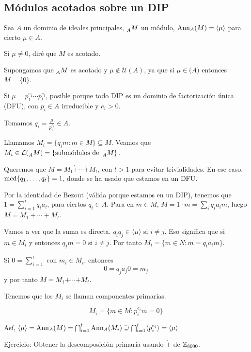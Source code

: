 \subsection{Módulos acotados sobre un DIP}

\begin{df}
  Sea \(A\) un dominio de ideales principales, \(\prescript{}{A}{M}\)
  un módulo, \(\operatorname{Ann}_A(M)=\langle\mu\rangle\) para cierto \(\mu\in A\).

  Si \(\mu\neq 0\), diré que \(M\) es acotado.
\end{df}

Supongamos que \(\prescript{}{A}{M}\) es acotado y \(\mu\not\in
\mathcal{U}(A)\), ya que si \(\mu\in\mathcal(A)\) entonces \(M=\{0\}\).

Si \(\mu=p_1^{e_1}\cdots p_t^{e_t}\), posible porque todo DIP es un
dominio de factorización única (DFU), con \(p_i\in A\) irreducible
y \(e_i>0\).

\begin{prop}
  Tomamos \(q_i=\frac{\mu}{p_i^{e_i}}\in A\).

  Llamamos \(M_i=\{q_i m:m \in M\}\subseteq M\). Veamos
  que \(M_i\in\mathcal{L}(\prescript{}{A}{M})=\{\textrm{submódulos
  de } \prescript{}{A}{M}\}\).

  Queremos que \(M=M_1\dot{+}\cdots \dot{+}M_t\), con \(t>1\) para
  evitar trivialidades. En ese caso, \(\operatorname{mcd}\{q_1,\ldots,q_t\}=1\),
  donde se ha usado que estamos en un DFU.\@

  Por la identidad de Bezout (válida porque estamos en un DIP),
  tenemos que \(1=\sum_{i=1}^t q_i a_i\), para ciertos \(q_i\in A\).
  Para en \(m\in M\), \(M=1\cdot m=\sum_i q_i a_i m\), luego
  \(M=M_1+\cdots+ M_t\).

  Vamos a ver que la suma es directa.
  \(q_i q_j\in\langle\mu\rangle\) si \(i\neq j\). Eso significa que si
  \(m\in M_i\) y entonces \(q_j m= 0\) si \(i\neq j\).
  Por tanto \(M_i=\{m\in N: m=q_i a_i m\}\).

  Si \(0=\sum_{i=1}^t\) con \(m_i\in M_i\), entonces
  \[
    0=q_j a_j 0=m_j
  \]
  y por tanto \(M=M_1\dot{+}\cdots\dot{+} M_t\).
\end{prop}

\begin{df}
  Tenemos que los \(M_i\) se llaman componentes primarias.
\end{df}
\begin{prop}
  \[
    M_i=\{m\in M: p_i^{e_i} m=0\}
  \]

  Así, \(\langle\mu\rangle=\operatorname{Ann}_A(M)=\bigcap_{i=1}^t\operatorname{Ann}_A(M_i)
  \supseteq\bigcap_{i=1}^t\langle p_i^{e_i}\rangle=\langle\mu\rangle\)
\end{prop}

Ejercicio: Obtener la descomposición primaria usando \(\dot{+}\) de
\(\mathbb{Z}_{8000}\).
